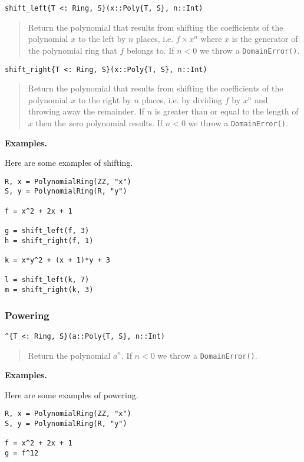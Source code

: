 \documentclass[a4paper,10pt]{article}
\newcommand{\code}{\lstinline}
\newcommand{\desc}[1]{\vspace{-3mm}\begin{quote}#1\end{quote}}
\begin{document}
{{\begin{lstlisting}
shift_left{T <: Ring, S}(x::Poly{T, S}, n::Int)
\end{lstlisting}

\desc{Return the polynomial that results from shifting the coefficients of the
polynomial $x$ to the left by $n$ places, i.e. $f\times x^n$ where $x$ is the
generator of the polynomial ring that $f$ belongs to. If $n < 0$ we throw a
\code{DomainError()}.}

\begin{lstlisting}
shift_right{T <: Ring, S}(x::Poly{T, S}, n::Int)
\end{lstlisting}

\desc{Return the polynomial that results from shifting the coefficients of the
polynomial $x$ to the right by $n$ places, i.e. by dividing $f$ by $x^n$ and
throwing away the remainder. If $n$ is greater than or equal to the length of
$x$ then the zero polynomial results. If $n < 0$ we throw a 
\code{DomainError()}.}

\textbf{Examples.}

Here are some examples of shifting.

\begin{lstlisting}
R, x = PolynomialRing(ZZ, "x")
S, y = PolynomialRing(R, "y")

f = x^2 + 2x + 1

g = shift_left(f, 3)
h = shift_right(f, 1)

k = x*y^2 + (x + 1)*y + 3

l = shift_left(k, 7)
m = shift_right(k, 3)
\end{lstlisting}

\subsubsection{Powering}

\begin{lstlisting}
^{T <: Ring, S}(a::Poly{T, S}, n::Int)
\end{lstlisting}

\desc{Return the polynomial $a^n$. If $n < 0$ we throw a \code{DomainError()}.}

\textbf{Examples.}

Here are some examples of powering.

\begin{lstlisting}
R, x = PolynomialRing(ZZ, "x")
S, y = PolynomialRing(R, "y")

f = x^2 + 2x + 1
g = f^12


\end{lstlisting}}}
\end{document}
